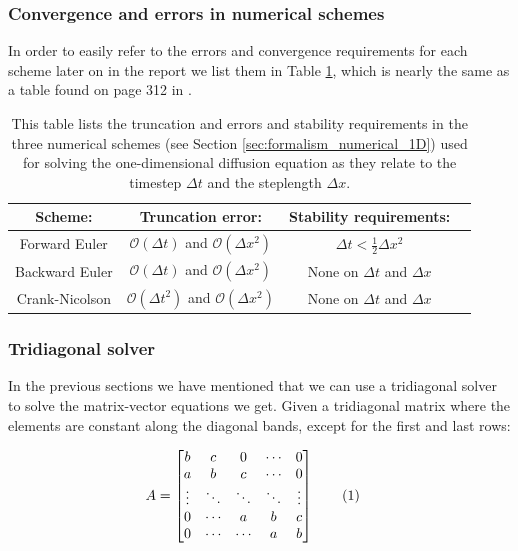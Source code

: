 \documentclass[reprint,english,notitlepage]{revtex4-1}  %
\newcommand\numberthis{\addtocounter{equation}{1}\tag{\theequation}}
\begin{document}
\subsubsection{Convergence and errors in numerical schemes} \label{sec:formalism_1D_diff_eq_numerical_conv_and_err}

In order to easily refer to the errors and convergence requirements for each scheme later on in the report we list them in Table \ref{table:schemes_conv_and_err_1D}, which is nearly the same as a table found on page 312 in \citep{Hjorth-Jensen2015}.

\begin{table}[H]
\centering
\caption{This table lists the truncation and errors and stability requirements in the three numerical schemes (see Section \ref{sec:formalism_numerical_1D}) used for solving the one-dimensional diffusion equation as they relate to the timestep $\Delta t$ and the steplength $\Delta x$.} \label{table:schemes_conv_and_err_1D}
\begin{tabular}{|c|c|c|c|}
\hline
Scheme: & Truncation error: & Stability requirements: \\
\hline
Forward Euler & $\mathcal{O}(\Delta t)$ and $\mathcal{O}(\Delta x^2)$ & $\Delta t < \frac{1}{2} \Delta x^2$ \\
\hline
Backward Euler & $\mathcal{O}(\Delta t)$ and $\mathcal{O}(\Delta x^2)$ & None on $\Delta t$ and $\Delta x$ \\\hline
Crank-Nicolson & $\mathcal{O}(\Delta t^2)$ and $\mathcal{O}(\Delta x^2)$ & None on $\Delta t$ and $\Delta x$ \\
\hline
\end{tabular}
\end{table}


\subsubsection{Tridiagonal solver} \label{sec:formalism_tridiagonal_solver}

In the previous sections we have mentioned that we can use a tridiagonal solver to solve the matrix-vector equations we get. Given a tridiagonal matrix where the elements are constant along the diagonal bands, except for the first and last rows:

\begin{align*}
A &= \begin{bmatrix}
b & c & 0  & \cdots & 0 \\
a & b & c &   \cdots & 0 \\
\vdots & \ddots & \ddots & \ddots & \vdots \\
0 & \cdots  & a & b & c \\
0 & \cdots & \cdots  & a & b \\
\end{bmatrix} \numberthis \label{eq:tridiag_matrix}
\end{align*}
\end{document}
